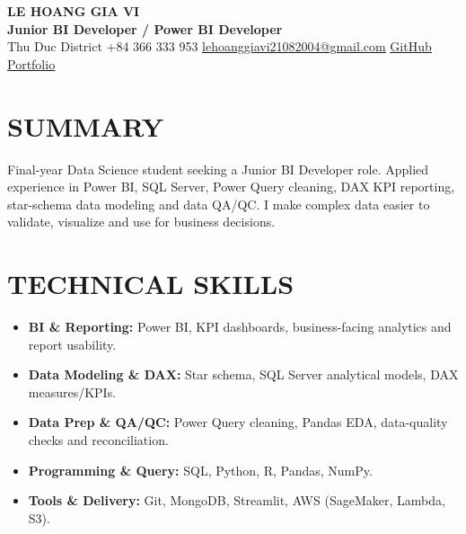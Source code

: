 \documentclass[10pt,letterpaper]{article}
\newcommand{\cvsection}[2]{\section*{\faIcon{#1}\hspace{0.45em}#2}}
\newcommand{\cvlink}[2]{\href{#1}{\underline{#2}}}
\newcommand{\cvitem}[1]{\item \small #1}
\begin{document}
\begin{center}
  {\fontsize{20}{22}\selectfont\bfseries LE HOANG GIA VI}\\[0.22em]
  {\fontsize{17}{19}\selectfont\bfseries Junior BI Developer / Power BI Developer}\\[0.42em]
  {\small
  \hspace{0.2em}Thu Duc District
  \quad
  \hspace{0.2em}+84 366 333 953
  \quad
  \hspace{0.2em}\cvlink{mailto:lehoanggiavi21082004@gmail.com}{lehoanggiavi21082004@gmail.com}
  \quad
  \hspace{0.2em}\cvlink{https://github.com/lehoanggiavi}{GitHub}
  \quad
  \hspace{0.2em}\cvlink{https://lehoanggiavi.github.io/portfolio/?role=da}{Portfolio}}
\end{center}

\cvsection{user}{SUMMARY}
\normalsize
Final-year Data Science student seeking a Junior BI Developer role. Applied experience in Power BI,
SQL Server, Power Query cleaning, DAX KPI reporting, star-schema data modeling and data QA/QC.
I make complex data easier to validate, visualize and use for business decisions.

\cvsection{tools}{TECHNICAL SKILLS}
\begin{itemize}[leftmargin=1.55em,itemsep=0em,topsep=0em,parsep=0em]
  \cvitem{\textbf{BI \& Reporting:} Power BI, KPI dashboards, business-facing analytics and report usability.}
  \cvitem{\textbf{Data Modeling \& DAX:} Star schema, SQL Server analytical models, DAX measures/KPIs.}
  \cvitem{\textbf{Data Prep \& QA/QC:} Power Query cleaning, Pandas EDA, data-quality checks and reconciliation.}
  \cvitem{\textbf{Programming \& Query:} SQL, Python, R, Pandas, NumPy.}
  \cvitem{\textbf{Tools \& Delivery:} Git, MongoDB, Streamlit, AWS (SageMaker, Lambda, S3).}
\end{itemize}
\end{document}
